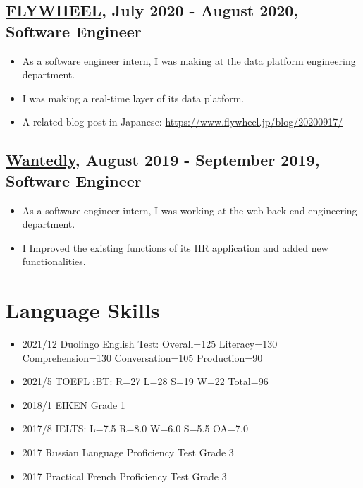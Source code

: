 \documentclass{article}
\begin{document}
  \subsection*{\href{https://www.flywheel.jp}{FLYWHEEL}, July 2020 - August 2020, Software Engineer}
    \begin{itemize}
      \item As a software engineer intern, I was making at the data platform engineering department.
      \item I was making a real-time layer of its data platform.
      \item A related blog post in Japanese: \url{https://www.flywheel.jp/blog/20200917/}
    \end{itemize}

  \subsection*{\href{https://wantedlyinc.com/ja}{Wantedly}, August 2019 - September 2019, Software Engineer}
    \begin{itemize}
      \item As a software engineer intern, I was working at the web back-end engineering department.
      \item I Improved the existing functions of its HR application and added new functionalities.
    \end{itemize}

\section*{Language Skills}
  \begin{itemize}
    \item 2021/12 Duolingo English Test: Overall=125 Literacy=130 Comprehension=130 Conversation=105 Production=90
    \item 2021/5 TOEFL iBT: R=27 L=28 S=19 W=22 Total=96
    \item 2018/1 EIKEN Grade 1
    \item 2017/8 IELTS: L=7.5 R=8.0 W=6.0 S=5.5 OA=7.0
    \item 2017 Russian Language Proficiency Test Grade 3
    \item 2017 Practical French Proficiency Test Grade 3
  \end{itemize}
\end{document}
